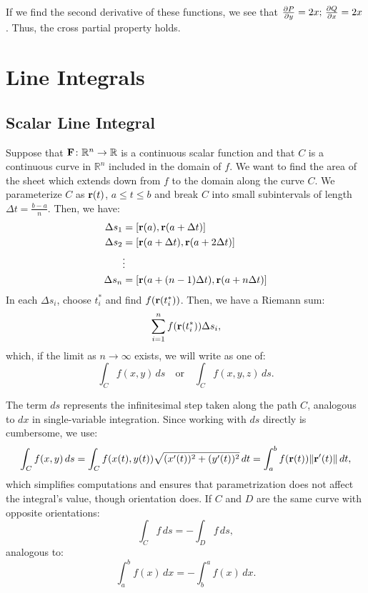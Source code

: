 If we find the second derivative of these functions, we see that \(\frac{\partial P}{\partial y} = 2x; \, \frac{\partial Q}{\partial x} = 2x\). Thus, the cross partial property holds. \\

\newpage

\section{Line Integrals}

\subsection{Scalar Line Integral}
Suppose that \( \mathbf{F} \colon \mathbb{R}^n \to \mathbb{R} \) is a continuous scalar function and that \( C \) is a continuous curve in \( \mathbb{R}^n \) included in the domain of \( f \). We want to find the area of the sheet which extends down from \( f \) to the domain along the curve \( C \). We parameterize \( C \) as \( \mathbf{r}(t) \), \( a \leq t \leq b \) and break \( C \) into small subintervals of length \( \Delta t = \frac{b-a}{n} \). Then, we have:
\begin{align*}
    \Delta s_1 &= [\mathbf{r}(a), \mathbf{r}(a + \Delta t)] \\
    \Delta s_2 &= [\mathbf{r}(a + \Delta t), \mathbf{r}(a + 2\Delta t)] \\
    &\vdots \\
    \Delta s_n &= [\mathbf{r}(a + (n - 1)\Delta t), \mathbf{r}(a + n\Delta t)]
\end{align*}
In each \( \Delta s_i \), choose \( t^*_i \) and find \( f(\mathbf{r}(t^*_i )) \). Then, we have a Riemann sum:
\[ \sum_{i=1}^{n} f(\mathbf{r}(t^*_i ))\Delta s_i, \]
which, if the limit as \( n \to \infty \) exists, we will write as one of:
\[ \int_C f(x, y) \, ds \quad \text{or} \quad \int_C f(x, y, z) \, ds. \]

The term \( ds \) represents the infinitesimal step taken along the path \( C \), analogous to \( dx \) in single-variable integration. Since working with \( ds \) directly is cumbersome, we use:
\[ \int_C f(x, y) \, ds = \int_C f(x(t), y(t)) \sqrt{(x'(t))^2 + (y'(t))^2} \, dt = \int_a^b f(\mathbf{r}(t)) \| \mathbf{r}'(t) \| \, dt, \]
which simplifies computations and ensures that parametrization does not affect the integral's value, though orientation does. If \( C \) and \( D \) are the same curve with opposite orientations:
\[ \int_C f \, ds = - \int_D f \, ds, \]
analogous to:
\[ \int_a^b f(x) \, dx = - \int_b^a f(x) \, dx. \]

